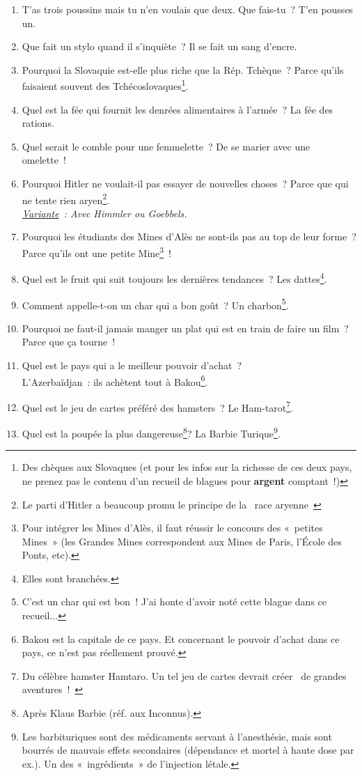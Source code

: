 \documentclass[10pt,a5paper,fullpage]{book}
\begin{document}
\begin{enumerate}
		\item T’as trois poussins mais tu n'en voulais que deux. Que fais-tu~? T’en pousses un.
		\item Que fait un stylo quand il s’inquiète~? Il se fait un sang d’encre.
		\item Pourquoi la Slovaquie est-elle plus riche que la Rép. Tchèque~? Parce qu’ils faisaient souvent des Tchécoslovaques\footnote{Des chèques aux Slovaques (et pour les infos sur la richesse de ces deux pays, ne prenez pas le contenu d'un recueil de blagues pour \textbf{argent} comptant~!)}.
		\item Quel est la fée qui fournit les denrées alimentaires à l’armée~? La fée des rations.
		\item Quel serait le comble pour une femmelette~? De se marier avec une omelette~!
		\item Pourquoi Hitler ne voulait-il pas essayer de nouvelles choses~? Parce que qui ne tente rien aryen\footnote{Le parti d'Hitler a beaucoup promu le principe de la \guillemotleft~race aryenne~\guillemotright}. \\\textit{\underline{Variante}~: Avec Himmler ou Goebbels.}
		\item Pourquoi les étudiants des Mines d’Alès ne sont-ils pas au top de leur forme~? Parce qu’ils ont une petite Mine\footnote{Pour intégrer les Mines d’Alès, il faut réussir le concours des « petites Mines » (les Grandes Mines correspondent aux Mines de Paris, l’École des Ponts, etc).}~!
		\item Quel est le fruit qui suit toujours les dernières tendances~? Les dattes\footnote{Elles sont branchées.}.
		\item Comment appelle-t-on un char qui a bon goût~? Un charbon\footnote{C'est un char qui est bon~! J'ai honte d'avoir noté cette blague dans ce recueil...}.
		\item Pourquoi ne faut-il jamais manger un plat qui est en train de faire un film~? Parce que ça tourne~!
		\item Quel est le pays qui a le meilleur pouvoir d’achat~? \\L’Azerbaïdjan~: ils achètent tout à Bakou\footnote{Bakou est la capitale de ce pays. Et concernant le pouvoir d'achat dans ce pays, ce n'est pas réellement prouvé.}.
		\item Quel est le jeu de cartes préféré des hamsters~? Le Ham-tarot\footnote{Du célèbre hamster Hamtaro. Un tel jeu de cartes devrait créer \guillemotleft~de grandes aventures~!~\guillemotright}.
		\item Quel est la poupée la plus dangereuse\footnote{Après Klaus Barbie (réf. aux Inconnus).}? La Barbie Turique\footnote{Les barbituriques sont des médicaments servant à l’anesthésie, mais sont bourrés de mauvais effets secondaires (dépendance et mortel à haute dose par ex.). Un des « ingrédients » de l’injection létale.}. 

\end{enumerate}
\end{document}
